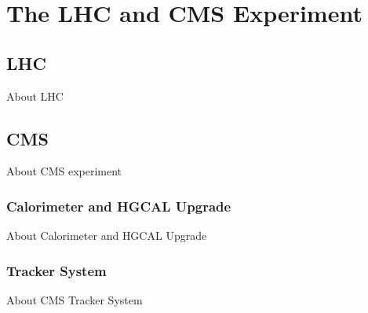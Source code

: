 \chapter{
  The LHC and CMS Experiment
 }\label{experiment}

\section{
  LHC
 }\label{experiment:lhc}

About \gls{LHC}

\section{
  CMS
 }\label{experiment:cms}

About \gls{CMS} experiment

\subsection{
  Calorimeter and HGCAL Upgrade
}

About Calorimeter and \gls{HGCAL} Upgrade

\subsection{
  Tracker System
}

About \gls{CMS} Tracker System